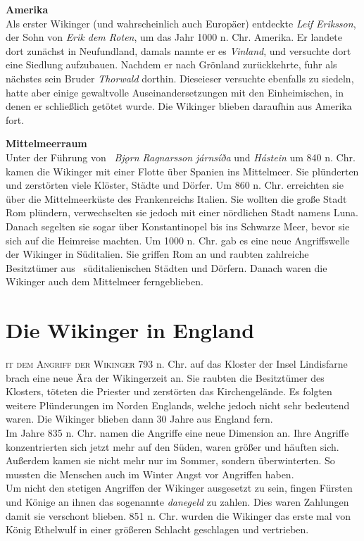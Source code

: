 \documentclass[12pt,a4paper,ngerman,openany]{book}
\newcommand{\flettrine}[2]{\lettrine[lines=2, depth=0, loversize=0.25, nindent=0.69pt, lraise=0.15]{\initfamily{#1}}{#2}}
\newcommand*\initfamily{\usefont{U}{GotIn}{xl}{n}}
\begin{document}
\textbf{Amerika}\\
Als erster Wikinger (und wahrscheinlich auch Europäer) entdeckte \textit{Leif Eriksson}, der Sohn von \textit{Erik dem Roten}, um das Jahr 1000 n. Chr. Amerika. Er landete dort zunächst in Neufundland, damals nannte er es \textit{Vinland}, und versuchte dort eine Siedlung aufzubauen. Nachdem er nach Grönland zurückkehrte, fuhr als nächstes sein Bruder \textit{Thorwald} dorthin. Dieseieser versuchte ebenfalls zu siedeln, hatte aber einige gewaltvolle Auseinandersetzungen mit den Einheimischen, in denen er schließlich getötet wurde. Die Wikinger blieben daraufhin aus Amerika fort.

\textbf{Mittelmeerraum}\\
Unter der Führung von  \textit{Bjǫrn Ragnarsson járnsíða} und \textit{Hástein} um 840 n. Chr. kamen die Wikinger mit einer Flotte über Spanien ins Mittelmeer. Sie plünderten und zerstörten viele Klöster, Städte und Dörfer. Um 860 n. Chr. erreichten sie über die Mittelmeerküste des Frankenreichs Italien. Sie wollten die große Stadt Rom plündern, verwechselten sie jedoch mit einer nördlichen Stadt namens Luna. Danach segelten sie sogar über Konstantinopel bis ins Schwarze Meer, bevor sie sich auf die Heimreise machten. Um 1000 n. Chr. gab es eine neue Angriffswelle der Wikinger in Süditalien. Sie griffen Rom an und raubten zahlreiche Besitztümer aus  süditalienischen Städten und Dörfern.
Danach waren die Wikinger auch dem Mittelmeer ferngeblieben.


\section{Die Wikinger in England}
\flettrine{M}{it dem Angriff der Wikinger} 793 n. Chr. auf das Kloster der Insel Lindisfarne brach eine neue Ära der Wikingerzeit an. Sie raubten die Besitztümer des Klosters, töteten die Priester und zerstörten das Kirchengelände. Es folgten weitere Plünderungen im Norden Englands, welche jedoch nicht sehr bedeutend waren. Die Wikinger blieben dann 30 Jahre aus England fern. \\
Im Jahre 835 n. Chr. namen die Angriffe eine neue Dimension an. Ihre Angriffe konzentrierten sich jetzt mehr auf den Süden, waren größer und häuften sich. Außerdem kamen sie nicht mehr nur im Sommer, sondern überwinterten. So mussten die Menschen auch im Winter Angst vor Angriffen haben. \\
Um nicht den stetigen Angriffen der Wikinger ausgesetzt zu sein, fingen Fürsten und Könige an ihnen das sogenannte \textit{danegeld} zu zahlen. Dies waren Zahlungen damit sie verschont blieben.
851 n. Chr. wurden die Wikinger das erste mal von König Ethelwulf in einer größeren Schlacht geschlagen und vertrieben.
\end{document}
